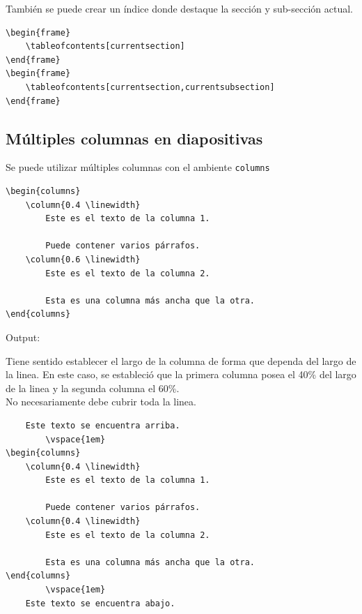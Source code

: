 \documentclass[../notes.tex]{subfiles}
\begin{document}
        También se puede crear un índice donde destaque la sección y sub-sección actual.
        \begin{verbatim}
\begin{frame}
    \tableofcontents[currentsection]
\end{frame}
\begin{frame}
    \tableofcontents[currentsection,currentsubsection]
\end{frame}
        \end{verbatim}

    \subsection{Múltiples columnas en diapositivas}

        Se puede utilizar múltiples columnas con el ambiente \texttt{columns}
        \begin{verbatim}
\begin{columns}
    \column{0.4 \linewidth}
        Este es el texto de la columna 1.
            
        Puede contener varios párrafos.
    \column{0.6 \linewidth}
        Este es el texto de la columna 2.
            
        Esta es una columna más ancha que la otra.
\end{columns}
        \end{verbatim}
    Output:
    
        
            Tiene sentido establecer el largo de la columna de forma que dependa del largo de la linea. En este caso, se estableció que la primera columna posea el 40\% del largo de la linea y la segunda columna el 60\%.\\[\baselineskip]
            
            No necesariamente debe cubrir toda la linea.
        
        \begin{verbatim}
    Este texto se encuentra arriba.
        \vspace{1em}
\begin{columns}
    \column{0.4 \linewidth}
        Este es el texto de la columna 1.
            
        Puede contener varios párrafos.
    \column{0.4 \linewidth}
        Este es el texto de la columna 2.
            
        Esta es una columna más ancha que la otra.
\end{columns}
        \vspace{1em}
    Este texto se encuentra abajo.
        \end{verbatim}
        
\end{document}
